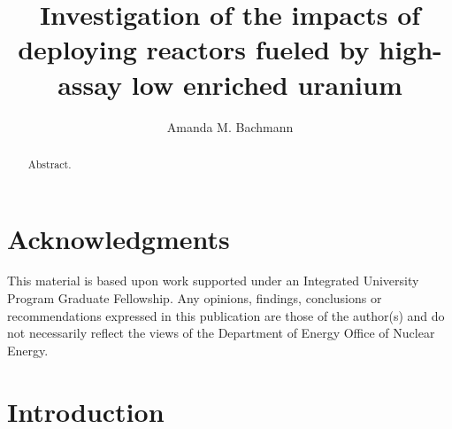 \documentclass[edeposit,fullpage]{uiucthesis2018}
\title{Investigation of the impacts of deploying reactors fueled by high-assay low enriched uranium}
\author{Amanda M. Bachmann}
\begin{document}
\maketitle

\frontmatter
\begin{abstract}

Abstract.

\end{abstract}

\chapter*{Acknowledgments}

This material is based upon work supported under an Integrated University 
Program Graduate Fellowship. Any opinions, findings, conclusions or 
recommendations expressed in this publication are those of the author(s) 
and do not necessarily reflect the views of the Department of Energy Office 
of Nuclear Energy.


\tableofcontents
\listoftables
\listoffigures


\pagebreak
\mainmatter

\chapter{Introduction}

\end{document}
